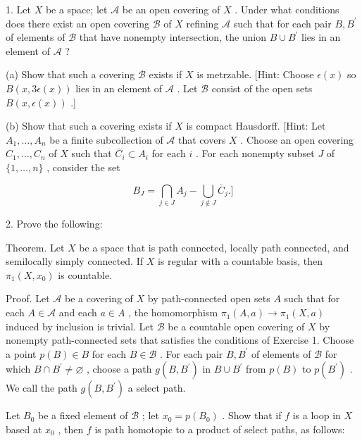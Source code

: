 1. Let \(X\) be a space; let \(\mathcal{A}\) be an open covering of \(X\) . Under what conditions does there exist an open covering \(\mathcal{B}\) of \(X\) refining \(\mathcal{A}\) such that for each pair \(B,{B}^{\prime }\) of elements of \(\mathcal{B}\) that have nonempty intersection, the union \(B \cup  {B}^{\prime }\) lies in an element of \(\mathcal{A}\) ?

(a) Show that such a covering \(\mathcal{B}\) exists if \(X\) is metrzable. [Hint: Choose \(\epsilon \left( x\right)\) so \(B\left( {x,{3\epsilon }\left( x\right) }\right)\) lies in an element of \(\mathcal{A}\) . Let \(\mathcal{B}\) consist of the open sets \(B\left( {x,\epsilon \left( x\right) }\right)\) .]

(b) Show that such a covering exists if \(X\) is compact Hausdorff. [Hint: Let \({A}_{1},\ldots ,{A}_{n}\) be a finite subcollection of \(\mathcal{A}\) that covers \(X\) . Choose an open covering \({C}_{1},\ldots ,{C}_{n}\) of \(X\) such that \({\bar{C}}_{i} \subset  {A}_{i}\) for each \(i\) . For each nonempty subset \(J\) of \(\{ 1,\ldots ,n\}\) , consider the set

\[
{B}_{J} = \mathop{\bigcap }\limits_{{j \in  J}}{A}_{j} - \mathop{\bigcup }\limits_{{j \notin  J}}{\bar{C}}_{j}.\rbrack
\]

2. Prove the following:

Theorem. Let \(X\) be a space that is path connected, locally path connected, and semilocally simply connected. If \(X\) is regular with a countable basis, then \({\pi }_{1}\left( {X,{x}_{0}}\right)\) is countable.

Proof. Let \(\mathcal{A}\) be a covering of \(X\) by path-connected open sets \(A\) such that for each \(A \in  \mathcal{A}\) and each \(a \in  A\) , the homomorphism \({\pi }_{1}\left( {A,a}\right)  \rightarrow  {\pi }_{1}\left( {X,a}\right)\) induced by inclusion is trivial. Let \(\mathcal{B}\) be a countable open covering of \(X\) by nonempty path-connected sets that satisfies the conditions of Exercise 1. Choose a point \(p\left( B\right)  \in  B\) for each \(B \in  \mathcal{B}\) . For each pair \(B,{B}^{\prime }\) of elements of \(\mathcal{B}\) for which \(B \cap  {B}^{\prime } \neq  \varnothing\) , choose a path \(g\left( {B,{B}^{\prime }}\right)\) in \(B \cup  {B}^{\prime }\) from \(p\left( B\right)\) to \(p\left( {B}^{\prime }\right)\) . We call the path \(g\left( {B,{B}^{\prime }}\right)\) a select path.

Let \({B}_{0}\) be a fixed element of \(\mathcal{B}\) ; let \({x}_{0} = p\left( {B}_{0}\right)\) . Show that if \(f\) is a loop in \(X\) based at \({x}_{0}\) , then \(f\) is path homotopic to a product of select paths, as follows:


